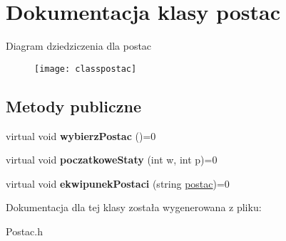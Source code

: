 \hypertarget{classpostac}{}\section{Dokumentacja klasy postac}
\label{classpostac}
Diagram dziedziczenia dla postac\begin{figure}[H]
\begin{center}
\leavevmode
\texttt{[image: classpostac]}
\end{center}
\end{figure}
\subsection*{Metody publiczne}
\begin{DoxyCompactItemize}
\item 
virtual void {\bfseries wybierz\+Postac} ()=0\hypertarget{classpostac_a9c9d54380373bf15e9fdb18a1ef8ff91}{}\label{classpostac_a9c9d54380373bf15e9fdb18a1ef8ff91}

\item 
virtual void {\bfseries poczatkowe\+Staty} (int w, int p)=0\hypertarget{classpostac_a7f206bd087f4cb57d716c5ff663746f2}{}\label{classpostac_a7f206bd087f4cb57d716c5ff663746f2}

\item 
virtual void {\bfseries ekwipunek\+Postaci} (string \hyperlink{classpostac}{postac})=0\hypertarget{classpostac_a0020fb6dcc24a9ee0a6ceee7dc91b5cb}{}\label{classpostac_a0020fb6dcc24a9ee0a6ceee7dc91b5cb}

\end{DoxyCompactItemize}


Dokumentacja dla tej klasy została wygenerowana z pliku\+:\begin{DoxyCompactItemize}
\item 
Postac.\+h\end{DoxyCompactItemize}
